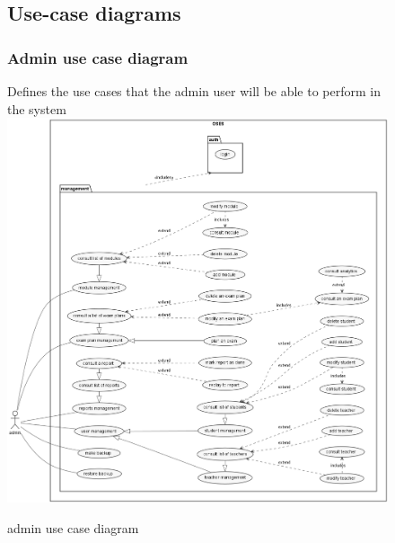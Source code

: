 \documentclass[]{uc2pfecaneva}
\begin{document}


    \begin{figure}
        \raggedright\subsection{Use-case diagrams}
        \subsubsection{Admin use case diagram}
        Defines the use cases that the admin user will be able to perform in the system
        \includegraphics[width=\textwidth]{images/admin_UCD}
        \caption{admin use case diagram}
    \end{figure}
    \clearpage
\end{document}
